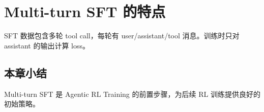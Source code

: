 \section{Multi-turn SFT 的特点}
SFT 数据包含多轮 tool call，每轮有 user/assistant/tool 消息。训练时只对 assistant 的输出计算 loss。

\subsection{本章小结}
Multi-turn SFT 是 Agentic RL Training 的前置步骤，为后续 RL 训练提供良好的初始策略。

\newpage
